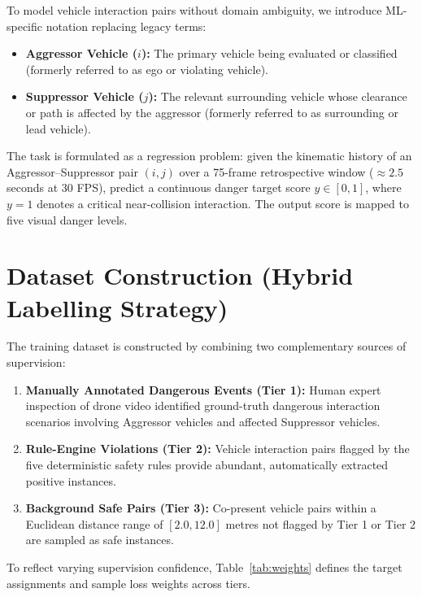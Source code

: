 \documentclass[12pt,a4paper]{report}
\begin{document}
To model vehicle interaction pairs without domain ambiguity, we introduce ML-specific notation replacing legacy terms:
\begin{itemize}
    \item \textbf{Aggressor Vehicle ($i$):} The primary vehicle being evaluated or classified (formerly referred to as ego or violating vehicle).
    \item \textbf{Suppressor Vehicle ($j$):} The relevant surrounding vehicle whose clearance or path is affected by the aggressor (formerly referred to as surrounding or lead vehicle).
\end{itemize}

The task is formulated as a regression problem: given the kinematic history of an Aggressor--Suppressor pair $(i, j)$ over a 75-frame retrospective window ($\approx 2.5$ seconds at 30 FPS), predict a continuous danger target score $y \in [0,1]$, where $y = 1$ denotes a critical near-collision interaction. The output score is mapped to five visual danger levels.

\section{Dataset Construction (Hybrid Labelling Strategy)}

The training dataset is constructed by combining two complementary sources of supervision:
\begin{enumerate}
    \item \textbf{Manually Annotated Dangerous Events (Tier 1):} Human expert inspection of drone video identified ground-truth dangerous interaction scenarios involving Aggressor vehicles and affected Suppressor vehicles.
    \item \textbf{Rule-Engine Violations (Tier 2):} Vehicle interaction pairs flagged by the five deterministic safety rules provide abundant, automatically extracted positive instances.
    \item \textbf{Background Safe Pairs (Tier 3):} Co-present vehicle pairs within a Euclidean distance range of $[2.0, 12.0]$ metres not flagged by Tier 1 or Tier 2 are sampled as safe instances.
\end{enumerate}

To reflect varying supervision confidence, Table~\ref{tab:weights} defines the target assignments and sample loss weights across tiers.
\end{document}
